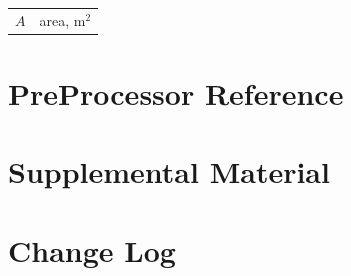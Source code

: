 \documentclass[12pt,twoside]{book}
\begin{document}
\begin{center}
\begin{longtable}{p{1in}  p{5.5 in}}

$A$                 & area, m$^2$ \\
\end{longtable}

\end{center}

\chapter{PreProcessor Reference}
\label{preprocessor_reference}

\chapter{Supplemental Material}

\chapter{Change Log}

\label{last_page}
\end{document}
